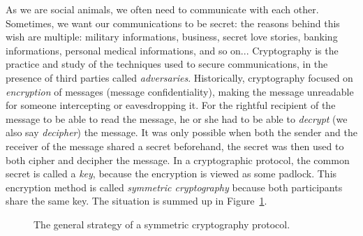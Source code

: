 As we are social animals, we often need to communicate with each other.
Sometimes, we want our communications to be secret: the reasons behind this
wish are multiple: military informations, business, secret love stories, banking
informations, personal medical informations, and so on... Cryptography is the
practice and study of the techniques used to secure communications, in the
presence of third parties called \emph{adversaries}. Historically, cryptography
focused on \emph{encryption} of messages (message confidentiality), \ie making
the message unreadable for someone intercepting or eavesdropping it. For the
rightful recipient of the message to be able to read the message, he or she had
to be able to \emph{decrypt} (we also say \emph{decipher}) the message. It was
only possible when both the sender and the receiver of the message shared a
secret beforehand, the secret was then used to both cipher and decipher the
message. In a cryptographic protocol, the common secret is called a
\emph{key}, because the encryption is viewed as some padlock. This encryption
method is called \emph{symmetric cryptography} because both participants share
the same key. The situation is summed up in Figure~\ref{fig:crypto-sym}.
\begin{figure}[h]
  \centering
  \caption{The general strategy of a symmetric cryptography protocol.}
  \label{fig:crypto-sym}
\end{figure}
